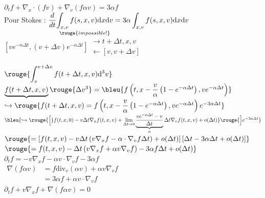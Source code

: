 \documentclass[12pt,a4paper]{article}
\begin{document}
\begin{enumerate}[label=\alph*)]
\begin{minipage}[t]{18.5cm}
{\begin{minipage}[t]{18.5cm}
		\vspace{.5cm}
		
		$\partial_t f + \nabla_x\cdot \left(fv\right) + \nabla_v\left(f\alpha v\right) = 3\alpha f$\\
		
		Pour Stokes : $\dfrac d{dt} \displaystyle\underset{\rouge{impossible !}}{\int_{x,v} f(s,x,v)\mathrm dx \mathrm dv} = 3\alpha\int_{x,v} f(s,x,v)\mathrm dx \mathrm dv$\\
		
		$\left[ve^{-\alpha \Delta t},(v+\Delta v)e^{-\alpha\Delta t}\right] \begin{aligned}
			\longrightarrow t+\Delta t, x,v \\
			\longleftarrow \left[v,v+\Delta v\right]
		\end{aligned}$
		
		\vspace{1cm}
		
		$\rouge{\displaystyle\int_v^{v+\Delta v} f(t+\Delta t,x,v) \mathrm d^3v}$\\
		$\underbrace{f(t+\Delta t,x,v)}\rouge{\Delta v^3} = \bleu{f\left(t,x-\dfrac v\alpha\left(1-e^{-\alpha\Delta t}\right),ve^{-\alpha\Delta t}\right)}$\\
		\hspace*{1.2cm}$\hookrightarrow \rouge{f(t+\Delta t,x,v) = f\left(t,x-\dfrac v\alpha \left(1-e^{-\alpha\Delta t}\right),ve^{-\alpha\Delta t}\right)e^{-3\alpha\Delta t}}$\\
		
		$\bleu{\hookrightarrow  \rouge{\Big[}f(t,x,0)-v\Delta t\nabla_x f(t,x,v) + \underset{\Delta t \to 0}{\lim} \underbrace{\dfrac{ve^{-\alpha\Delta t}-v}{\Delta t}}_\alpha\Delta t \nabla_v f(t,x,v) + o(\Delta t)}\rouge{\Big]e^{-3\alpha\Delta t}}$\\
		$\rouge{=\left[f(t,x,v)-v\Delta t\left(v\nabla_x f - \alpha \cdot\nabla_v f\Delta t\right)+o(\Delta t)\right]\left[\Delta t-3\alpha\Delta t + o(\Delta t)\right]}$\\
		$\rouge{= f(t,x,v)-\Delta t\left(v\nabla_x f + \alpha v\nabla_v f\right) - 3\alpha f \Delta t + o(\Delta t)}$\\
		
		$\partial_t f = -v\nabla_x f - \alpha v \cdot\nabla_v f - 3\alpha f$\\
		$\begin{aligned}
			\nabla\left(f\alpha v\right) &= f\mathrm{div}_v\left(\alpha v\right)+\alpha v \nabla_v f \\
			&= 3 \alpha f + \alpha v\cdot \nabla_v f
		\end{aligned}$\\
		
		$\partial_t f + v\nabla_x f + \nabla\left(f\alpha v\right) = 0$
		
		\end{minipage}
		}
	\end{minipage}
\end{enumerate}
\end{document}
